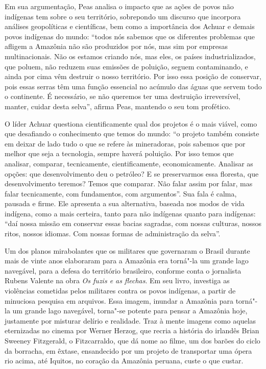 Em sua argumentação, Peas analisa o impacto que as ações de povos
não indígenas tem sobre o seu território, sobrepondo um discurso que
incorpora análises geopolíticas e científicas, bem como a importância
dos Achuar e demais povos indígenas do mundo: ``todos nós
sabemos que os diferentes problemas que afligem a Amazônia não são
produzidos por nós, mas sim por empresas multinacionais. Não os estamos
criando nós, mas eles, os países industrializados, que poluem, não
reduzem suas emissões de poluição, seguem contaminando, e ainda por cima
vêm destruir o nosso território. Por isso essa posição de conservar,
pois essas serras têm uma função essencial no acúmulo das águas que
servem todo o continente. É necessário, se não queremos ter uma
destruição irreversível, manter, cuidar desta selva'', afirma Peas,
mantendo o seu tom profético.

O líder Achuar questiona cientificamente qual dos projetos é o mais
viável, como que desafiando o conhecimento que temos do
mundo: ``o projeto também consiste em deixar de lado tudo o que se
refere às mineradoras, pois sabemos que por melhor que seja a
tecnologia, sempre haverá poluição. Por isso temos que analisar,
comparar, tecnicamente, cientificamente, economicamente. Analisar as
opções: que desenvolvimento deu o petróleo? E se preservarmos essa
floresta, que desenvolvimento teremos? Temos que comparar. Não falar
assim por falar, mas falar tecnicamente, com fundamentos, com
argumentos''. Sua fala é calma, pausada e firme. Ele apresenta a sua
alternativa, baseada nos modos de vida indígena, como a mais certeira,
tanto para não indígenas quanto para indígenas: ``daí nossa missão em
conservar essas bacias sagradas, com nossas culturas, nossos ritos,
nossos idiomas. Com nossas formas de administração da selva''.

\asterisc

Um dos planos mirabolantes que os militares que governaram o Brasil
durante mais de vinte anos elaboraram para a Amazônia era torná"-la um
grande lago navegável, para a defesa do território brasileiro, conforme
conta o jornalista Rubens Valente na obra \emph{Os fuzis e as flechas}.
Em seu livro, investiga as violências cometidas pelos militares contra os povos
indígenas, a partir de minuciosa pesquisa em arquivos. Essa imagem,
inundar a Amazônia para torná"-la um grande lago navegável, torna"-se
potente para pensar a Amazônia hoje, justamente por misturar delírio e
realidade. Traz à mente imagens como aquelas eternizadas no cinema por
Werner Herzog, que recria a história do irlandês Brian Sweeney
Fitzgerald, o Fitzcarraldo, que dá nome ao filme, um dos barões do ciclo da borracha, em
êxtase, ensandecido por um projeto de transportar uma ópera rio acima,
até Iquitos, no coração da Amazônia peruana, custe o que custar.

